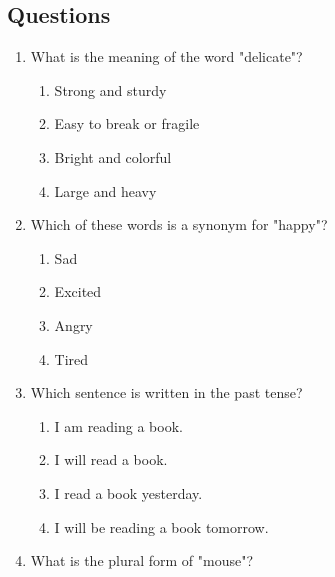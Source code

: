 \documentclass[12pt]{article}
\begin{document}
\onehalfspacing

 \subsection*{Questions}

\begin{enumerate}

    \item What is the meaning of the word "delicate"?

    \begin{enumerate}[label=\Alph*.]
        \item Strong and sturdy
        \item Easy to break or fragile
        \item Bright and colorful
        \item Large and heavy
    \end{enumerate}

    \vspace{0.5cm}

    \item Which of these words is a synonym for "happy"?

    \begin{enumerate}[label=\Alph*.]
        \item Sad
        \item Excited
        \item Angry
        \item Tired
    \end{enumerate}

    \vspace{0.5cm}

    \item Which sentence is written in the past tense?

    \begin{enumerate}[label=\Alph*.]
        \item I am reading a book.
        \item I will read a book.
        \item I read a book yesterday.
        \item I will be reading a book tomorrow.
    \end{enumerate}

    \vspace{0.5cm}

    \item What is the plural form of "mouse"?


\end{enumerate}
\end{document}
